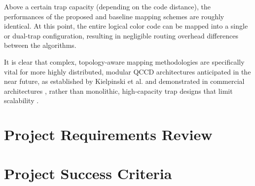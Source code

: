 Above a certain trap capacity (depending on the code distance), the performances of the proposed and baseline mapping schemes are roughly identical. At this point, the entire logical color code can be mapped into a single or dual-trap configuration, resulting in  negligible routing overhead differences between the algorithms. 

It is clear that complex, topology-aware mapping methodologies are specifically vital for more highly distributed, modular QCCD architectures anticipated in the near future, as established by Kielpinski et al. \cite{qccd2002} and demonstrated in commercial architectures \cite{honeywellqccd, quantinuumH2}, rather than monolithic, high-capacity trap designs that limit scalability \cite{wineland1998experimental, hughes1996decoherence}.




\section{Project Requirements Review}



\section{Project Success Criteria}
